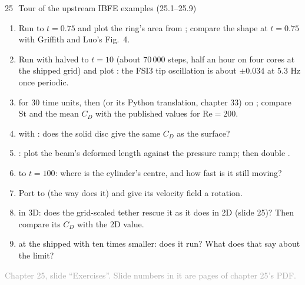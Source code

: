 \documentclass[aspectratio=169,11pt]{beamer}
\newcommand{\sourcecredit}[1]{\vfill\begin{flushright}\tiny\textcolor{DarkGray}{#1}\end{flushright}}
\begin{document}
\begin{frame}{25\,\textbullet\ Tour of the upstream IBFE examples (25.1--25.9)}
\label{fr:c25x1}
\footnotesize
\begin{enumerate}
  \item[25.1] Run  to $t = 0.75$ and plot the ring's area from ; compare the shape at $t = 0.75$ with Griffith and Luo's Fig.\ 4.
  \item[25.2] Run  with  halved to $t = 10$ (about $70\,000$ steps, half an hour on four cores at the shipped grid) and plot : the FSI3 tip oscillation is about $\pm0.034$ at $5.3$ Hz once periodic.
  \item[25.3]  for $30$ time units, then  (or its Python translation, chapter 33) on ; compare $\mathrm{St}$ and the mean $C_D$ with the published values for $\mathrm{Re} = 200$.
  \item[25.4]  with : does the solid disc give the same $C_D$ as the surface?
  \item[25.5] : plot the beam's deformed length against the pressure ramp; then double .
  \item[25.6]  to $t = 100$: where is the cylinder's centre, and how fast is it still moving?
  \item[25.7] Port  to  (the way  does it) and give its velocity field a rotation.
  \item[25.8]  in 3D: does the grid-scaled tether rescue it as it does in 2D (slide 25)? Then compare its $C_D$ with the 2D value.
  \item[25.9]  at the shipped  with  ten times smaller: does it run? What does that say about the limit?
\end{enumerate}
\sourcecredit{Chapter 25, slide ``Exercises''. Slide numbers in it are pages of chapter 25's PDF.}
\end{frame}
\end{document}
